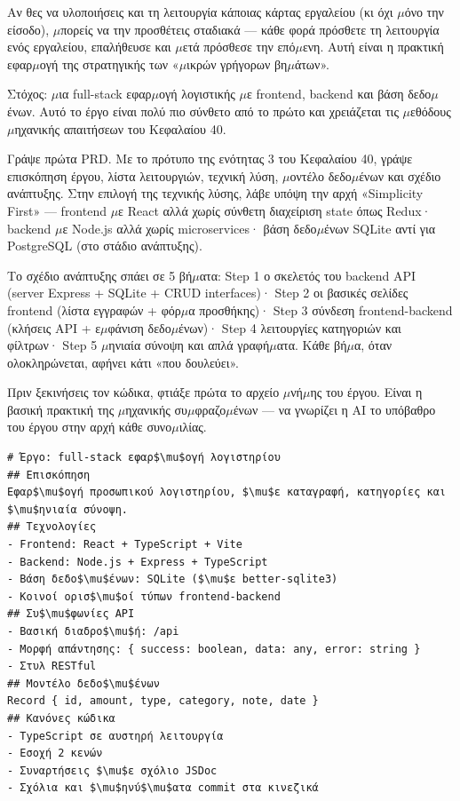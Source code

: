 Αν θες να υλοποιήσεις και τη λειτουργία κάποιας κάρτας εργαλείου (κι όχι $\mu$όνο την είσοδο), $\mu$πορείς να την προσθέτεις σταδιακά — κάθε φορά πρόσθετε τη λειτουργία ενός εργαλείου, επαλήθευσε και $\mu$ετά πρόσθεσε την επό$\mu$ενη. Αυτή είναι η πρακτική εφαρ$\mu$ογή της στρατηγικής των «$\mu$ικρών γρήγορων βη$\mu$άτων».



Στόχος: $\mu$ια full-stack εφαρ$\mu$ογή λογιστικής $\mu$ε frontend, backend και βάση δεδο$\mu$ένων. Αυτό το έργο είναι πολύ πιο σύνθετο από το πρώτο και χρειάζεται τις $\mu$εθόδους $\mu$ηχανικής απαιτήσεων του Κεφαλαίου 40.

Γράψε πρώτα PRD. Με το πρότυπο της ενότητας 3 του Κεφαλαίου 40, γράψε επισκόπηση έργου, λίστα λειτουργιών, τεχνική λύση, $\mu$οντέλο δεδο$\mu$ένων και σχέδιο ανάπτυξης. Στην επιλογή της τεχνικής λύσης, λάβε υπόψη την αρχή «Simplicity First» — frontend $\mu$ε React αλλά χωρίς σύνθετη διαχείριση state όπως Redux· backend $\mu$ε Node.js αλλά χωρίς microservices· βάση δεδο$\mu$ένων SQLite αντί για PostgreSQL (στο στάδιο ανάπτυξης).

Το σχέδιο ανάπτυξης σπάει σε 5 βή$\mu$ατα: Step 1 ο σκελετός του backend API (server Express + SQLite + CRUD interfaces)· Step 2 οι βασικές σελίδες frontend (λίστα εγγραφών + φόρ$\mu$α προσθήκης)· Step 3 σύνδεση frontend-backend (κλήσεις API + ε$\mu$φάνιση δεδο$\mu$ένων)· Step 4 λειτουργίες κατηγοριών και φίλτρων· Step 5 $\mu$ηνιαία σύνοψη και απλά γραφή$\mu$ατα. Κάθε βή$\mu$α, όταν ολοκληρώνεται, αφήνει κάτι «που δουλεύει».


Πριν ξεκινήσεις τον κώδικα, φτιάξε πρώτα το αρχείο $\mu$νή$\mu$ης του έργου. Είναι η βασική πρακτική της $\mu$ηχανικής συ$\mu$φραζο$\mu$ένων — να γνωρίζει η AI το υπόβαθρο του έργου στην αρχή κάθε συνο$\mu$ιλίας.

\begin{lstlisting}
# Έργο: full-stack εφαρ$\mu$ογή λογιστηρίου
## Επισκόπηση
Εφαρ$\mu$ογή προσωπικού λογιστηρίου, $\mu$ε καταγραφή, κατηγορίες και $\mu$ηνιαία σύνοψη.
## Τεχνολογίες
- Frontend: React + TypeScript + Vite
- Backend: Node.js + Express + TypeScript
- Βάση δεδο$\mu$ένων: SQLite ($\mu$ε better-sqlite3)
- Κοινοί ορισ$\mu$οί τύπων frontend-backend
## Συ$\mu$φωνίες API
- Βασική διαδρο$\mu$ή: /api
- Μορφή απάντησης: { success: boolean, data: any, error: string }
- Στυλ RESTful
## Μοντέλο δεδο$\mu$ένων
Record { id, amount, type, category, note, date }
## Κανόνες κώδικα
- TypeScript σε αυστηρή λειτουργία
- Εσοχή 2 κενών
- Συναρτήσεις $\mu$ε σχόλιο JSDoc
- Σχόλια και $\mu$ηνύ$\mu$ατα commit στα κινεζικά
\end{lstlisting}

